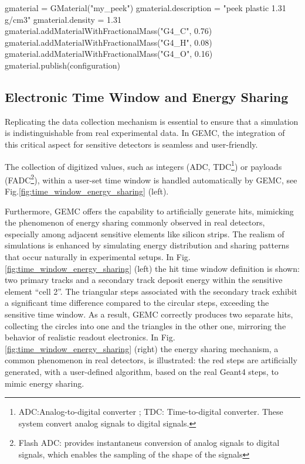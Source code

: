 \begin{pycode}
gmaterial = GMaterial("my_peek")
gmaterial.description = "peek plastic 1.31 g/cm3"
gmaterial.density = 1.31
gmaterial.addMaterialWithFractionalMass("G4_C", 0.76)
gmaterial.addMaterialWithFractionalMass("G4_H", 0.08)
gmaterial.addMaterialWithFractionalMass("G4_O", 0.16)
gmaterial.publish(configuration)
\end{pycode}

\subsection{Electronic Time Window and Energy Sharing}
\label{subsec:time_window}

Replicating the data collection mechanism is essential to ensure that a simulation is
indistinguishable from real experimental data.
In GEMC, the integration of this critical aspect for sensitive detectors is seamless and user-friendly.

The collection of digitized values, such as integers (ADC, TDC\footnote{ADC:Analog-to-digital converter
; TDC: Time-to-digital converter. These system convert analog signals to digital signals.})
or payloads (FADC\footnote{Flash ADC: provides instantaneus conversion of analog signals to digital signals,
which enables the sampling of the shape of the signals}), within a user-set time window is handled automatically by GEMC,
see Fig.\ref{fig:time_window_energy_sharing} (left).

Furthermore, GEMC offers the capability to artificially generate hits, mimicking the phenomenon of
energy sharing commonly observed in real detectors, especially among adjacent sensitive elements like silicon strips.
The realism of simulations is enhanced by simulating energy distribution and sharing patterns
that occur naturally in experimental setups.
In Fig.\ref{fig:time_window_energy_sharing} (left) the hit
time window definition is shown: two primary tracks and a secondary track deposit energy within
the sensitive element ``cell 2''.
The triangular steps associated with the secondary track
exhibit a significant time difference compared to the circular steps, exceeding the sensitive time window.
As a result, GEMC correctly produces two separate hits, collecting the circles into one and the triangles
in the other one, mirroring the behavior of realistic readout electronics.
In Fig.\ref{fig:time_window_energy_sharing} (right) the energy sharing mechanism, a common phenomenon in real detectors,
is illustrated: the red steps are artificially generated, with a user-defined algorithm, based on the real Geant4 steps,
to mimic energy sharing.

